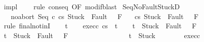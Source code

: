 \begin{isabellebody}
%
\isadelimproof
%
\endisadelimproof
%
\isatagproof
{}\isamarkupfalse%
\ impl\ \isanewline
{}\isamarkupfalse%
\ {\isacharminus}\ \ {\isacharparenleft}rule\ conseq\ {\isacharbrackleft}OF\ modif{\isacharbrackright}{\isacharcomma}blast{\isacharparenright}%
\endisatagproof
{\isafoldproof}%
%
\isadelimproof
\isanewline
%
\endisadelimproof
\isanewline
\isanewline
{}\isamarkupfalse%
\ Seq{\isacharunderscore}NoFaultStuckD{}{\isacharcolon}\ \isanewline
\ \ \ noabort{\isacharcolon}\ {\isachardoublequoteopen}{\isasymGamma}{\isasymturnstile}{\isasymlangle}Seq\ c{}\ c{}{\isacharcomma}s{\isasymrangle}\ {\isasymRightarrow}{\isasymnotin}{\isacharparenleft}{\isacharbraceleft}Stuck{\isacharbraceright}\ {\isasymunion}\ Fault\ {\isacharbackquote}\ \ F{\isacharparenright}{\isachardoublequoteclose}\isanewline
\ \ \ {\isachardoublequoteopen}{\isasymGamma}{\isasymturnstile}{\isasymlangle}c{}{\isacharcomma}s{\isasymrangle}\ {\isasymRightarrow}{\isasymnotin}{\isacharparenleft}{\isacharbraceleft}Stuck{\isacharbraceright}\ {\isasymunion}\ Fault\ {\isacharbackquote}\ \ F{\isacharparenright}{\isachardoublequoteclose}\isanewline
%
\isadelimproof
%
\endisadelimproof
%
\isatagproof
{}\isamarkupfalse%
\ {\isacharparenleft}rule\ final{\isacharunderscore}notinI{\isacharparenright}\isanewline
\ \ \isamarkupfalse%
\ t\isanewline
\ \ \isamarkupfalse%
\ exec{\isacharunderscore}c{}{\isacharcolon}\ {\isachardoublequoteopen}{\isasymGamma}{\isasymturnstile}{\isasymlangle}c{}{\isacharcomma}s{\isasymrangle}\ {\isasymRightarrow}\ t{\isachardoublequoteclose}\isanewline
\ \ \isamarkupfalse%
\ {\isachardoublequoteopen}t\ {\isasymnotin}\ {\isacharbraceleft}Stuck{\isacharbraceright}\ {\isasymunion}\ Fault\ {\isacharbackquote}\ \ F{\isachardoublequoteclose}\isanewline
\ \ \isamarkupfalse%
\ \isanewline
\ \ \ \ \isamarkupfalse%
\ {\isachardoublequoteopen}t\ {\isasymin}\ {\isacharbraceleft}Stuck{\isacharbraceright}\ {\isasymunion}\ Fault\ {\isacharbackquote}\ \ F{\isachardoublequoteclose}\isanewline
\ \ \ \ \isamarkupfalse%
\isanewline
\ \ \ \ \isacommand{{\isacharbraceleft}}\isamarkupfalse%
\isanewline
\ \ \ \ \ \ \isamarkupfalse%
\ {\isachardoublequoteopen}t\ {\isacharequal}\ Stuck{\isachardoublequoteclose}\isanewline
\ \ \ \ \ \ \isamarkupfalse%
\ exec{\isacharunderscore}c{}\isanewline

\end{isabellebody}
